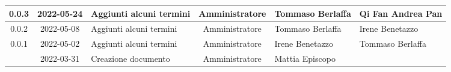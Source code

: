 \begin{center}
\begin{longtable}{ |c|c|p{8em}|c|m{5em}|m{6em}| }
	\hline
	0.0.3 & 2022-05-24 & Aggiunti alcuni termini & Amministratore & Tommaso \newline Berlaffa & Qi Fan \newline Andrea Pan\\
	\hline
	0.0.2 & 2022-05-08 & Aggiunti alcuni termini & Amministratore & Tommaso \newline Berlaffa & Irene \newline Benetazzo\\
	\hline
	0.0.1 & 2022-05-02 & Aggiunti alcuni termini & Amministratore & Irene \newline Benetazzo & Tommaso \newline Berlaffa\\
	\hline
  	& 2022-03-31 & Creazione documento & Amministratore & Mattia \newline Episcopo & \\ 
	\hline
	\end{longtable}
	\end{center}
	\newpage